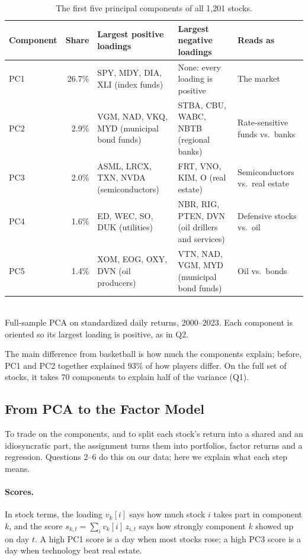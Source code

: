\documentclass[12pt,letterpaper]{article}
\begin{document}
\begin{table}[H]
\centering
\caption{The first five principal components of all 1,201 stocks.}
\label{tab:primer-full}
\small
\setlength{\tabcolsep}{4pt}
\begin{tabular}{lr >{\raggedright\arraybackslash}p{3.6cm} >{\raggedright\arraybackslash}p{3.6cm} >{\raggedright\arraybackslash}p{3.2cm}}
\toprule
Component & Share & Largest positive loadings & Largest negative loadings & Reads as \\
\midrule
PC1 & 26.7\% & SPY, MDY, DIA, XLI (index funds) & None: every loading is positive & The market \\
\addlinespace
PC2 & 2.9\% & VGM, NAD, VKQ, MYD (municipal bond funds) & STBA, CBU, WABC, NBTB (regional banks) & Rate-sensitive funds vs.\ banks \\
\addlinespace
PC3 & 2.0\% & ASML, LRCX, TXN, NVDA (semiconductors) & FRT, VNO, KIM, O (real estate) & Semiconductors vs.\ real estate \\
\addlinespace
PC4 & 1.6\% & ED, WEC, SO, DUK (utilities) & NBR, RIG, PTEN, DVN (oil drillers and services) & Defensive stocks vs.\ oil \\
\addlinespace
PC5 & 1.4\% & XOM, EOG, OXY, DVN (oil producers) & VTN, NAD, VGM, MYD (municipal bond funds) & Oil vs.\ bonds \\
\bottomrule
\end{tabular}
\\[4pt]
\small Full-sample PCA on standardized daily returns, 2000--2023. Each
component is oriented so its largest loading is positive, as in Q2.
\end{table}
The main difference from basketball is how much the components explain; before, PC1 and PC2 together explained $93\%$ of how players differ. On the full set of stocks, it takes 70 components to explain half of the variance (Q1). 
\subsection{From PCA to the Factor Model}
To trade on the components, and to split each stock's return into a
shared and an idiosyncratic part, the assignment turns them into
portfolios, factor returns and a regression. Questions 2--6 do this on
our data; here we explain what each step means.

\paragraph{Scores.} In stock terms, the loading $v_k[i]$ says how much
stock $i$ takes part in component $k$, and the score
$s_{k,t}=\sum_i v_k[i]\,z_{i,t}$ says how strongly component $k$ showed up
on day $t$. A high PC1 score is a day when most stocks rose; a high PC3
score is a day when technology beat real estate.
\end{document}
